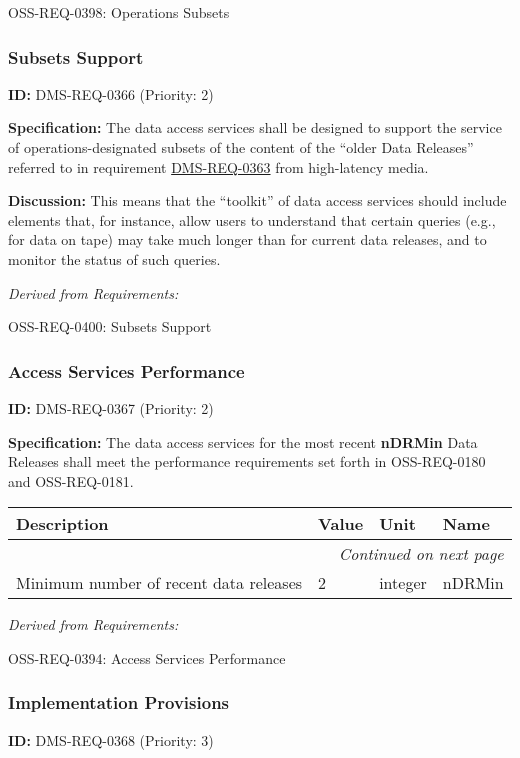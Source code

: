 \documentclass[SE,toc,lsstdraft]{lsstdoc}
\makeatletter
\newcommand{\paramname}[1]{\hspace{0pt}#1}
\newcommand{\unitname}[1]{\hspace{0pt}#1}
\newenvironment{parameters}[0]{%
\setlength\LTleft{0pt}
\setlength\LTright{\fill}
\begin{small}
\begin{longtable}[]{|p{0.49\textwidth}|l|p{0.6in}|p{1.70in}@{}|}

\hline \textbf{Description} & \textbf{Value} & \textbf{Unit} & \textbf{Name} \\ \hline
\endhead

\hline \multicolumn{4}{r}{\emph{Continued on next page}} \\
\endfoot

\hline\hline
\endlastfoot
}{%
\hline
\end{longtable}
\end{small}
}
\makeatother
\begin{document}
OSS-REQ-0398:
Operations Subsets \newline

\subsubsection{Subsets Support}

\label{DMS-REQ-0366}
\textbf{ID:} DMS-REQ-0366 (Priority: 2)

\textbf{Specification:}
The data access services shall be designed to support the service of operations-designated subsets of the content of the “older Data Releases” referred to in requirement \hyperref[DMS-REQ-0363]{DMS-REQ-0363} from high-latency media.

\textbf{Discussion:}
This means that the “toolkit” of data access services should include elements that, for instance, allow users to understand that certain queries (e.g., for data on tape) may take much longer than for current data releases, and to monitor the status of such queries.

\emph{Derived from Requirements:}

OSS-REQ-0400:
Subsets Support \newline

\subsubsection{Access Services Performance}

\label{DMS-REQ-0367}
\textbf{ID:} DMS-REQ-0367 (Priority: 2)

\textbf{Specification:}
The data access services for the most recent \textbf{nDRMin} Data Releases shall meet the performance requirements set forth in OSS-REQ-0180 and OSS-REQ-0181.

\begin{parameters}
Minimum number of recent data releases
&
2
&
\unitname{%
integer
}
&
\paramname{%
nDRMin
} \\\hline
\end{parameters}

\emph{Derived from Requirements:}

OSS-REQ-0394:
Access Services Performance \newline

\subsubsection{Implementation Provisions}

\label{DMS-REQ-0368}
\textbf{ID:} DMS-REQ-0368 (Priority: 3)
\end{document}
